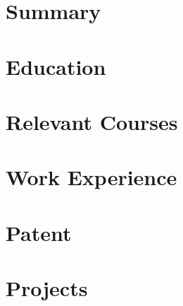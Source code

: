 \documentclass[letter,10pt]{article}
\begin{document}
\section{Summary}


\section{Education}


\section{Relevant Courses}


\section{Work Experience}


\section{Patent}


\section{Projects}

\end{document}
